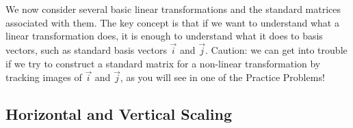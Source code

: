 \documentclass{ximera}
\begin{document}
We now consider several basic linear transformations and the standard matrices associated with them.  The key concept is that if we want to understand what a linear transformation does, it is enough to understand what it does to basis vectors, such as standard basis vectors $\vec{i}$ and $\vec{j}$.  Caution: we can get into trouble if we try to construct a standard matrix for a non-linear transformation by tracking images of $\vec{i}$ and $\vec{j}$, as you will see in one of the Practice Problems!  %

\subsection*{Horizontal and Vertical Scaling} 

\end{document}
